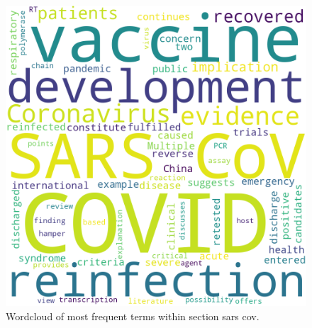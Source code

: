 \documentclass{qqtarticle}
\begin{document}
        \begin{figure}[H]
            \centering
            \includegraphics[width=.75\linewidth]{img/sarscov.png}
            \caption{Wordcloud of most frequent terms within section sars cov.}
            \label{fig:wcl_sarscov}
        \end{figure}
\end{document}
